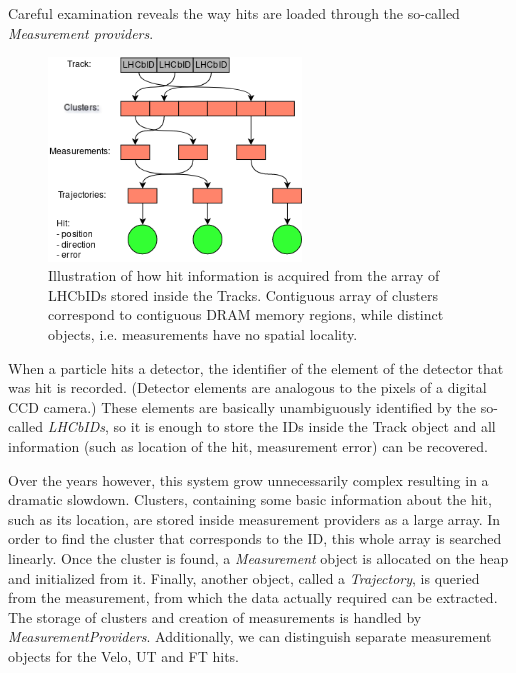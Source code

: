 \documentclass[12pt]{article}
\begin{document}
Careful examination reveals the way hits are loaded through the so-called \textit{Measurement providers}.
	
\begin{figure}[H]
	\begin{center}
		\includegraphics[width=0.6\textwidth]{kalmanfit_loadhits_schematic}
	\end{center}
	\caption{Illustration of how hit information is acquired from the array of LHCbIDs stored inside the Tracks. Contiguous array of clusters correspond to contiguous DRAM memory regions, while distinct objects, i.e. measurements have no spatial locality.}
	\label{fig_kalmanfit_loadhits_schematic}
\end{figure}

When a particle hits a detector, the identifier of the element of the detector that was hit is recorded. (Detector elements are analogous to the pixels of a digital CCD camera.) These elements are basically unambiguously identified by the so-called \textit{LHCbIDs}, so it is enough to store the IDs inside the Track object and all information (such as location of the hit, measurement error) can be recovered. 

Over the years however, this system grow unnecessarily complex resulting in a dramatic slowdown. Clusters, containing some basic information about the hit, such as its location, are stored inside measurement providers as a large array. In order to find the cluster that corresponds to the ID, this whole array is searched linearly. Once the cluster is found, a \textit{Measurement} object is allocated on the heap and initialized from it. Finally, another object, called a \textit{Trajectory}, is queried from the measurement, from which the data actually required can be extracted. The storage of clusters and creation of measurements is handled by \textit{MeasurementProviders}. Additionally, we can distinguish separate measurement objects for the Velo, UT and FT hits.
\end{document}
